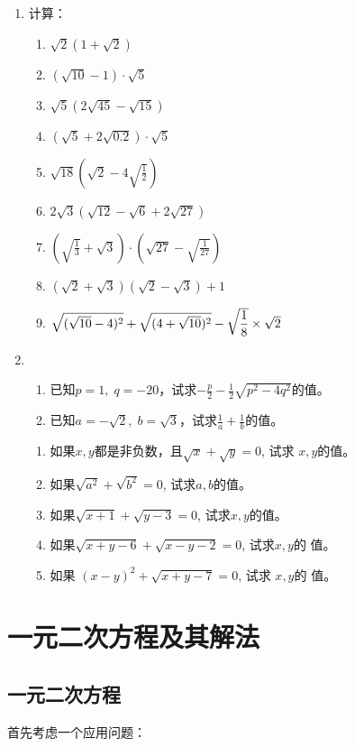 \begin{enumerate}
\item 计算：
\begin{enumerate}
    \item $\sqrt{2}(1+\sqrt{2})$
    \item $(\sqrt{10}-1)\cdot \sqrt{5}$
    \item $\sqrt{5}(2\sqrt{45}-\sqrt{15})$
    \item $(\sqrt{5}+2\sqrt{0.2})\cdot \sqrt{5}$
    \item $\sqrt{18}\left(\sqrt{2}-4\sqrt{\frac{1}{2}}\right)$
    \item $2\sqrt{3}\left(\sqrt{12}-\sqrt{6}+2\sqrt{27}\right)$
    \item $\left(\sqrt{\frac{1}{3}}+\sqrt{3}\right)\cdot \left(\sqrt{27}-\sqrt{\frac{1}{27}}\right)$
    \item $(\sqrt{2}+\sqrt{3})(\sqrt{2}-\sqrt{3})+1$
    \item $\sqrt{(\sqrt{10}-4)^2}+\sqrt{(4+\sqrt{10})^2}-\sqrt{\dfrac{1}{8}}\times \sqrt{2}$
\end{enumerate}

\item \begin{enumerate}
    \item 已知$p=1, \; q=-20$，试求$-\frac{p}{2}-\frac{1}{2}\sqrt{p^2-4q^2}$的值。
    \item 已知$a=-\sqrt{2},\; b=\sqrt{3}$，试求$\frac{1}{a}+\frac{1}{b}$的值。 
\end{enumerate}

\begin{enumerate}
    \item 如果$x,y$都是非负数，且$\sqrt{x}+\sqrt{y}=0$, 试求
$x,y$的值。
\item 如果$\sqrt{a^2}+\sqrt{b^2}=0$, 试求$a,b$的值。
\item 如果$\sqrt{x+1}+\sqrt{y-3}=0$, 试求$x,y$的值。
\item 如果$\sqrt{x+y-6}+\sqrt{x-y-2}=0$, 试求$x,y$的
值。
\item 如果
$(x-y)^2+\sqrt{x+y-7}=0$, 试求 $x,y$的
值。
\end{enumerate}

\end{enumerate}

\section{一元二次方程及其解法}
\subsection{一元二次方程}
首先考虑一个应用问题：

